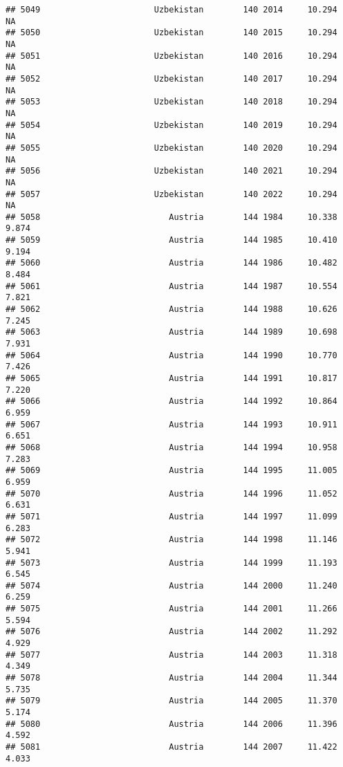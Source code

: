 \documentclass[
]{article}
\begin{document}
\begin{verbatim}
## 5049                       Uzbekistan        140 2014     10.294         NA
## 5050                       Uzbekistan        140 2015     10.294         NA
## 5051                       Uzbekistan        140 2016     10.294         NA
## 5052                       Uzbekistan        140 2017     10.294         NA
## 5053                       Uzbekistan        140 2018     10.294         NA
## 5054                       Uzbekistan        140 2019     10.294         NA
## 5055                       Uzbekistan        140 2020     10.294         NA
## 5056                       Uzbekistan        140 2021     10.294         NA
## 5057                       Uzbekistan        140 2022     10.294         NA
## 5058                          Austria        144 1984     10.338      9.874
## 5059                          Austria        144 1985     10.410      9.194
## 5060                          Austria        144 1986     10.482      8.484
## 5061                          Austria        144 1987     10.554      7.821
## 5062                          Austria        144 1988     10.626      7.245
## 5063                          Austria        144 1989     10.698      7.931
## 5064                          Austria        144 1990     10.770      7.426
## 5065                          Austria        144 1991     10.817      7.220
## 5066                          Austria        144 1992     10.864      6.959
## 5067                          Austria        144 1993     10.911      6.651
## 5068                          Austria        144 1994     10.958      7.283
## 5069                          Austria        144 1995     11.005      6.959
## 5070                          Austria        144 1996     11.052      6.631
## 5071                          Austria        144 1997     11.099      6.283
## 5072                          Austria        144 1998     11.146      5.941
## 5073                          Austria        144 1999     11.193      6.545
## 5074                          Austria        144 2000     11.240      6.259
## 5075                          Austria        144 2001     11.266      5.594
## 5076                          Austria        144 2002     11.292      4.929
## 5077                          Austria        144 2003     11.318      4.349
## 5078                          Austria        144 2004     11.344      5.735
## 5079                          Austria        144 2005     11.370      5.174
## 5080                          Austria        144 2006     11.396      4.592
## 5081                          Austria        144 2007     11.422      4.033

\end{verbatim}
\end{document}
